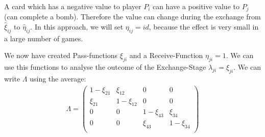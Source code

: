A card which has a negative value to player $P_i$ can have a positive value to $P_j$ (can complete a bomb). Therefore the value can change during the exchange from $\hat{\xi}_{ij}$ to $\hat{\eta}_{ij}$. In this approach, we will set $\eta_{ij} = id$, because the effect is very small in a large number of games. 

We now have created Pass-functions $\xi_{ji}$ and a Receive-Function $\eta_{ji} = 1$. We can use this functions to analyse the outcome of the Exchange-Stage $\lambda_{ji} = \xi_{ji}$. We can write $\Lambda$ using the average:
\begin{gather*}
\Lambda = \begin{pmatrix} 
1 - \xi_{21} & \xi_{12} & 0 & 0 \\
\xi_{21} & 1 - \xi_{12} & 0 & 0 \\
0 & 0 & 1 -  \xi_{43} & \xi_{34} \\
0 & 0 &  \xi_{43} & 1 - \xi_{34} \\
\end{pmatrix}
\end{gather*}

